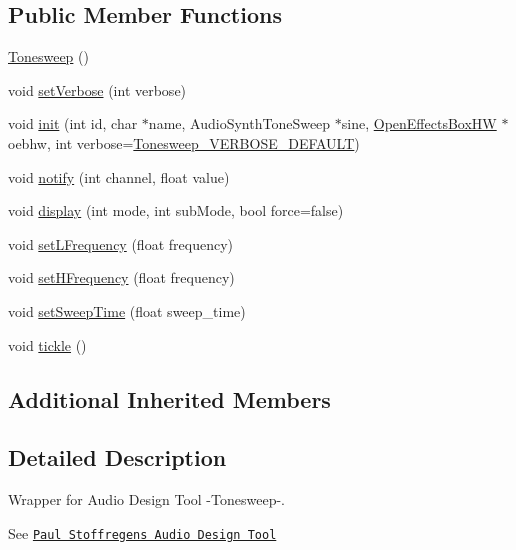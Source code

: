 \subsection*{Public Member Functions}
\begin{DoxyCompactItemize}
\item 
\mbox{\hyperlink{class_tonesweep_a72bce7be13a86848579bf58e8dc28dee}{Tonesweep}} ()
\item 
void \mbox{\hyperlink{class_tonesweep_aff2c8c7535cffc8b273bc6c24c3199f4}{set\+Verbose}} (int verbose)
\item 
void \mbox{\hyperlink{class_tonesweep_ae427b7379a9f769aa05aeca6ad77bdd5}{init}} (int id, char $\ast$name, Audio\+Synth\+Tone\+Sweep $\ast$sine, \mbox{\hyperlink{class_open_effects_box_h_w}{Open\+Effects\+Box\+HW}} $\ast$oebhw, int verbose=\mbox{\hyperlink{_tonesweep_8h_aea3aceb167682523467a7c0df63856ae}{Tonesweep\+\_\+\+V\+E\+R\+B\+O\+S\+E\+\_\+\+D\+E\+F\+A\+U\+LT}})
\item 
void \mbox{\hyperlink{class_tonesweep_a26d324fb0de4aac00a04e7e7e9e812c0}{notify}} (int channel, float value)
\item 
void \mbox{\hyperlink{class_tonesweep_ad16e1b0c7eb84827c3ee8a6ae43b0e81}{display}} (int mode, int sub\+Mode, bool force=false)
\item 
void \mbox{\hyperlink{class_tonesweep_a1c3ce513e5c8cff6f7489643a622f254}{set\+L\+Frequency}} (float frequency)
\item 
void \mbox{\hyperlink{class_tonesweep_aa4f50b9008e57267144ed3ac20ed977e}{set\+H\+Frequency}} (float frequency)
\item 
void \mbox{\hyperlink{class_tonesweep_af9a80c36bb303972c91fe12cddcb1a49}{set\+Sweep\+Time}} (float sweep\+\_\+time)
\item 
void \mbox{\hyperlink{class_tonesweep_a7b07248587a39ca50a852c38912512ec}{tickle}} ()
\end{DoxyCompactItemize}
\subsection*{Additional Inherited Members}


\subsection{Detailed Description}
Wrapper for Audio Design Tool -\/\+Tonesweep-\/. 

See \href{https://www.pjrc.com/teensy/gui/}{\tt Paul Stoffregen\textquotesingle{}s Audio Design Tool} 

